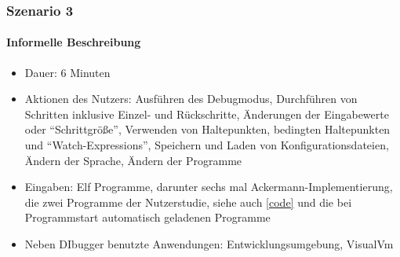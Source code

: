 \documentclass[parskip=full]{scrartcl}
\begin{document}
    \subsubsection{Szenario 3}
        \paragraph{Informelle Beschreibung}
        \begin{itemize}
            \item{Dauer:} 6 Minuten 
            \item{Aktionen des Nutzers:} Ausführen des Debugmodus, Durchführen von Schritten inklusive Einzel- und Rückschritte, Änderungen der Eingabewerte oder \enquote{Schrittgröße}, Verwenden von Haltepunkten, bedingten Haltepunkten und \enquote{Watch-Expressions}, Speichern und Laden von Konfigurationsdateien, Ändern der Sprache, Ändern der Programme
            \item{Eingaben:} Elf Programme, darunter sechs mal Ackermann-Implementierung, die zwei Programme der Nutzerstudie, siehe auch \ref{code} und die bei Programmstart automatisch geladenen Programme
            \item{Neben DIbugger benutzte Anwendungen:} Entwicklungsumgebung, VisualVm
        \end{itemize}
\end{document}
